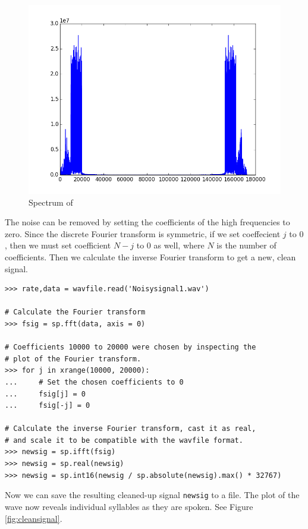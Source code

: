 \begin{figure}
\centering
\includegraphics[width=\textwidth]{figures/noisyspec}
\caption{Spectrum of }
\label{fig:noisyspec}
\end{figure}

The noise can be removed by setting the coefficients of the high frequencies to zero.
Since the discrete Fourier transform is symmetric, if we set coeffecient $j$ to $0$, then we must set coefficient $N - j$ to $0$ as well, where $N$ is the number of coefficients.
Then we calculate the inverse Fourier transform to get a new, clean signal.

\begin{lstlisting}
>>> rate,data = wavfile.read('Noisysignal1.wav')

# Calculate the Fourier transform
>>> fsig = sp.fft(data, axis = 0)

# Coefficients 10000 to 20000 were chosen by inspecting the
# plot of the Fourier transform.
>>> for j in xrange(10000, 20000):
...     # Set the chosen coefficients to 0
...     fsig[j] = 0
...     fsig[-j] = 0

# Calculate the inverse Fourier transform, cast it as real,
# and scale it to be compatible with the wavfile format.
>>> newsig = sp.ifft(fsig)
>>> newsig = sp.real(newsig)
>>> newsig = sp.int16(newsig / sp.absolute(newsig).max() * 32767)
\end{lstlisting}

Now we can save the resulting cleaned-up signal \texttt{newsig} to a  file.
The plot of the wave now reveals individual syllables as they are spoken.
See Figure \ref{fig:cleansignal}.

